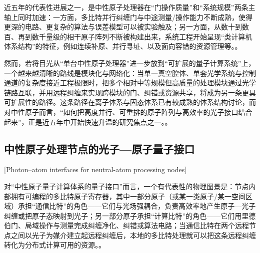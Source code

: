 近五年的代表性进展之一，是中性原子处理器在“门操作质量”和“系统规模”两条主轴上同时加速：一方面，多比特并行纠缠门与中途测量/操作能力不断成熟，使得更深的电路、更复杂的算法与误差模型可以被实验触及；另一方面，从数十到数百、再到数千量级的相干原子阵列不断被构建出来，系统工程开始呈现“类计算机体系结构”的特征，例如连续补原、并行寻址、以及面向容错的资源管理等。\cite{Evered2023HighFidelityParallelRydbergGates,Chiu2025ContinuousOperation3000Qubits,Li2025FiberArrayArchitectureAtomQC}。%

然而，若将目光从“单台中性原子处理器”进一步放到“可扩展的量子计算系统”上，一个越来越清晰的路线是模块化与网络化：当单一真空腔体、单套光学系统与控制通道的复杂度接近工程极限时，把多个相对中等规模但高质量的处理模块通过光学链路互联，并用远程纠缠来实现跨模块的门、纠错或资源共享，将成为另一条更具可扩展性的路径。这条路径在离子体系与固态体系已有较成熟的体系结构讨论，而对中性原子而言，“如何把高度并行、可重排的原子阵列与高效率的光子接口结合起来”，正是近五年中开始快速升温的研究焦点之一。\cite{Covey2023QuantumNetworksNeutralAtomNodes,Sinclair2024FaultTolerantOpticalInterconnectsNeutralAtoms}。%

\subsection{中性原子处理节点的光子—原子量子接口}[Photon–atom interfaces for neutral-atom processing nodes]

对“中性原子量子计算体系的量子接口”而言，一个有代表性的物理图景是：节点内部拥有可编程的多比特原子寄存器，其中一部分原子（或某一类原子/某一空间区域）承担“通信比特”的角色——它们与光场强耦合，负责高效率地产生原子—光子纠缠或把原子态映射到光子；另一部分原子承担“计算比特”的角色——它们用里德伯门、局域操作与测量完成纠缠净化、纠错或算法电路；当通信比特在两个远程节点之间以光子为媒介建立起远程纠缠后，本地的多比特处理就可以把这条远程纠缠转化为分布式计算可用的资源。\cite{Covey2023QuantumNetworksNeutralAtomNodes}。%

